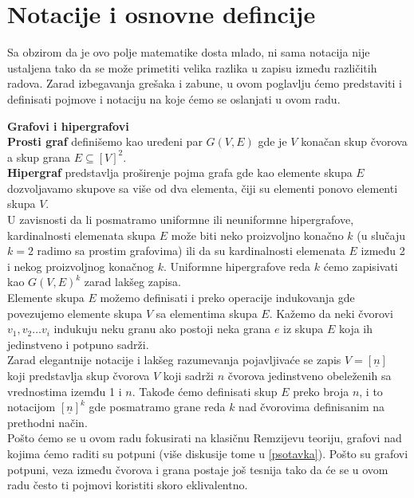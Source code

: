\documentclass[a4paper]{article}
\begin{document}
	\section{Notacije i osnovne defincije}
	Sa obzirom da je ovo polje matematike dosta mlado, ni sama notacija nije ustaljena tako da se može primetiti velika razlika u zapisu između različitih radova. Zarad izbegavanja grešaka i zabune, u ovom poglavlju ćemo predstaviti i definisati pojmove i notaciju na koje ćemo se oslanjati u ovom radu.
	\newline
	\begin{description}
		\item \textbf{Grafovi i hipergrafovi}\\
		\textbf{Prosti graf} definišemo kao uređeni par $G(V,E)$ gde je $V$ konačan skup čvorova a skup grana $E\subseteq[V]^2$. \\
		\textbf{Hipergraf} predstavlja proširenje pojma grafa gde kao elemente skupa $E$ dozvoljavamo skupove sa više od dva elementa, čiji su elementi ponovo elementi skupa $V$.\\ U zavisnosti da li posmatramo uniformne ili neuniformne hipergrafove, kardinalnosti elemenata skupa $E$ može biti neko proizvoljno konačno $k$ (u slučaju $k=2$ radimo sa prostim grafovima) ili da su kardinalnosti elemenata $E$ između 2 i nekog proizvoljnog konačnog $k$. Uniformne hipergrafove reda $k$ ćemo zapisivati kao $G(V, E)^k$ zarad lakšeg zapisa. \\
		Elemente skupa $E$ možemo definisati i preko operacije indukovanja gde povezujemo elemente skupa $V$ sa elementima skupa $E$. Kažemo da neki čvorovi $v_1, v_2 \dots v_i$ indukuju neku granu ako postoji neka grana $e$ iz skupa $E$ koja ih jedinstveno i potpuno sadrži. \\%
		Zarad elegantnije notacije i lakšeg razumevanja pojavljivaće se zapis $V=[\underline{n}]$ koji predstavlja skup čvorova $V$ koji sadrži $n$ čvorova jedinstveno obeleženih sa vrednostima izemđu 1 i $n$. Takođe ćemo definisati skup $E$ preko broja $n$, i to notacijom $[\underline{n}]^k$ gde posmatramo grane reda $k$ nad čvorovima definisanim na prethodni način.
		\\
		Pošto ćemo se u ovom radu fokusirati na klasičnu Remzijevu teoriju, grafovi nad kojima ćemo raditi su potpuni (više diskusije  tome u \ref{psotavka}). Pošto su grafovi potpuni, veza između čvorova i grana postaje još tesnija tako da će se u ovom radu često ti pojmovi koristiti skoro eklivalentno. \\

\end{description}
\end{document}
